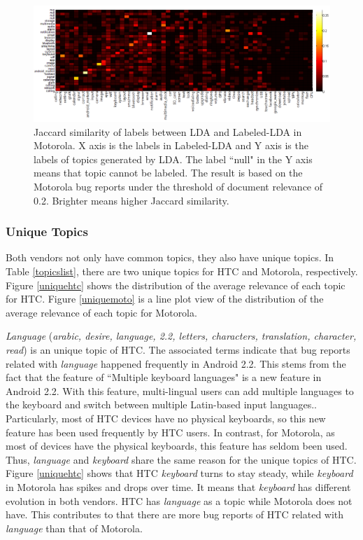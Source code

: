\documentclass[10pt, conference, compsocconf]{IEEEtran}
\begin{document}
\begin{figure}[htb]
\centering
\includegraphics[width=1\textwidth]{motosim.png}
\caption{Jaccard similarity of labels between LDA and Labeled-LDA in Motorola. X axis is the labels in Labeled-LDA and Y axis is the labels of topics generated by LDA. The label ``null" in the Y axis means that topic cannot be labeled. The result is based on the Motorola bug reports under the threshold of document relevance of 0.2. Brighter means higher Jaccard similarity.}
\label{similaritymoto}
\end{figure}


\subsubsection{Unique Topics}

Both vendors not only have common topics, they also have unique
topics. In Table \ref{topicslist}, there are two unique topics for HTC
and Motorola, respectively. Figure \ref{uniquehtc} shows the
distribution of the average relevance of each topic for HTC. Figure
\ref{uniquemoto} is a line plot view of the distribution of the
average relevance of each topic for Motorola.


\textit{Language} (\textit{arabic, desire, language, 2.2, letters,
  characters, translation, character, read}) is an unique topic of
HTC. The associated terms indicate that bug reports related with
\textit{language} happened frequently in Android 2.2. This stems from
the fact that the feature of ``Multiple keyboard languages" is a new
feature in Android 2.2. With this feature, multi-lingual users can add
multiple languages to the keyboard and switch between multiple
Latin-based input languages.\cite{androidwebsite}. Particularly, most
of HTC devices have no physical keyboards, so this new feature has
been used frequently by HTC users. In contrast, for Motorola, as most
of devices have the physical keyboards, this feature has seldom been
used. Thus, \textit{language} and \textit{keyboard} share the same
reason for the unique topics of HTC. Figure \ref{uniquehtc} shows that
HTC \textit{keyboard} turns to stay steady, while \textit{keyboard} in
Motorola has spikes and drops over time. It means that
\textit{keyboard} has different evolution in both vendors. HTC has
\textit{language} as a topic while Motorola does not have. This
contributes to that there are more bug reports of HTC related with
\textit{language} than that of Motorola.
\end{document}
